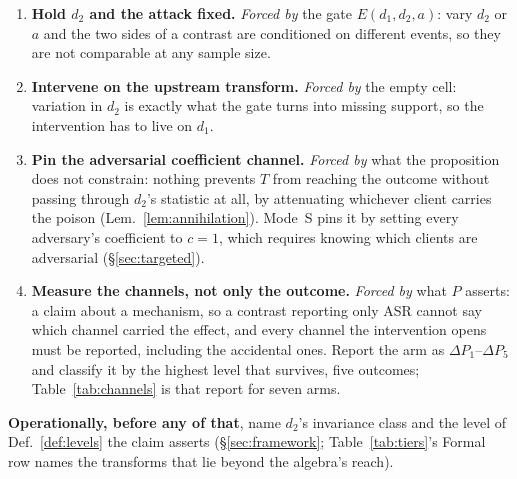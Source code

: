 \documentclass{article}
\begin{document}
\begin{enumerate}[noitemsep,topsep=2pt,leftmargin=*,label=(\arabic*)]
\item \textbf{Hold $d_2$ and the attack fixed.} \emph{Forced by} the gate $E(d_1,d_2,a)$: vary $d_2$ or $a$ and the two sides of a contrast are conditioned on different events, so they are not comparable at any sample size.
\item \textbf{Intervene on the upstream transform.} \emph{Forced by} the empty cell: variation in $d_2$ is exactly what the gate turns into missing support, so the intervention has to live on $d_1$.
\item \textbf{Pin the adversarial coefficient channel.} \emph{Forced by} what the proposition does not constrain: nothing prevents $T$ from reaching the outcome without passing through $d_2$'s statistic at all, by attenuating whichever client carries the poison (Lem.~\ref{lem:annihilation}). Mode~S pins it by setting every adversary's coefficient to $c{=}1$, which requires knowing which clients are adversarial (§\ref{sec:targeted}).
\item \textbf{Measure the channels, not only the outcome.} \emph{Forced by} what $P$ asserts: a claim about a mechanism, so a contrast reporting only ASR cannot say which channel carried the effect, and every channel the intervention opens must be reported, including the accidental ones. Report the arm as $\Delta P_1$--$\Delta P_5$ and classify it by the highest level that survives, five outcomes; Table~\ref{tab:channels} is that report for seven arms.
\end{enumerate}

\noindent \textbf{Operationally, before any of that}, name $d_2$'s invariance class and the level of Def.~\ref{def:levels} the claim asserts (§\ref{sec:framework}; Table~\ref{tab:tiers}'s Formal row names the transforms that lie beyond the algebra's reach).
\end{document}
